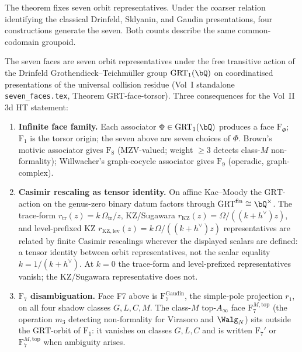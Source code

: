 \begin{remark}
\label{rem:seven-vs-four-resolution}
The theorem fixes seven orbit representatives. Under the coarser
relation identifying the classical Drinfeld, Sklyanin, and Gaudin
presentations, four constructions generate the seven. Both counts
describe the same common-codomain groupoid.
\end{remark}

\begin{remark}
\label{rem:grt-torsor-3d-ht}
\label{rem:grt-casimir-fm99}
The seven faces are seven orbit representatives under the free
transitive action of the Drinfeld Grothendieck--Teichm\"uller
group $\mathrm{GRT}_1(\bQ)$ on coordinatised presentations of the
universal collision residue (Vol~I standalone
\texttt{seven\_faces.tex}, Theorem GRT-face-torsor). Three
consequences for the Vol~II 3d HT statement:

\begin{enumerate}[label=\textup{(\roman*)}]
\item \textbf{Infinite face family.} Each associator
$\Phi\in\mathrm{GRT}_1(\bQ)$ produces a face $\mathrm{F}_\Phi$;
$\mathrm{F}_1$ is the torsor origin; the seven above are seven
choices of $\Phi$. Brown's motivic associator gives
$\mathrm{F}_8$ (MZV-valued; weight $\geq 3$ detects class-$M$
non-formality); Willwacher's graph-cocycle associator gives
$\mathrm{F}_9$ (operadic, graph-complex).

\item \textbf{Casimir rescaling as tensor identity.} On affine
Kac--Moody the $\mathrm{GRT}$-action on the genus-zero binary
datum factors through $\mathrm{GRT}^{\mathrm{fin}}\cong\bQ^\times$.
The trace-form $r_{\mathrm{tr}}(z)=k\,\Omega_{\mathrm{tr}}/z$, KZ/Sugawara
$r_{\mathrm{KZ}}(z)=\Omega/((k+h^\vee)z)$, and level-prefixed KZ
$r_{\mathrm{KZ,lev}}(z)=k\,\Omega/((k+h^\vee)z)$ representatives
are related by finite Casimir rescalings wherever the displayed
scalars are defined: a tensor identity between orbit
representatives, not the scalar equality $k = 1/(k+h^\vee)$. At
$k=0$ the trace-form and level-prefixed representatives vanish;
the KZ/Sugawara representative does not.

\item \textbf{$\mathrm{F}_7$ disambiguation.} Face F7 above is
$\mathrm{F}_7^{\mathrm{Gaudin}}$, the simple-pole projection
$r_1$, on all four shadow classes $G,L,C,M$. The class-$M$
top-$A_\infty$ face $\mathrm{F}_7^{M,\mathrm{top}}$ (the operation
$m_3$ detecting non-formality for Virasoro and $\Walg_N$) sits
outside the $\mathrm{GRT}$-orbit of $\mathrm{F}_1$: it vanishes on
classes $G,L,C$ and is written $\mathrm{F}_7'$ or
$\mathrm{F}_7^{M,\mathrm{top}}$ when ambiguity arises.


\end{enumerate}
\end{remark}
